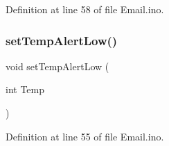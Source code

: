 Definition at line 58 of file Email.\+ino.

\mbox{\label{_email_8ino_a124dc2ddafba2583d01a77a194ad859f}} 
\subsubsection{\texorpdfstring{setTempAlertLow()}{setTempAlertLow()}}
{\footnotesize\ttfamily void set\+Temp\+Alert\+Low (\begin{DoxyParamCaption}\item[{int}]{Temp }\end{DoxyParamCaption})}



Definition at line 55 of file Email.\+ino.

